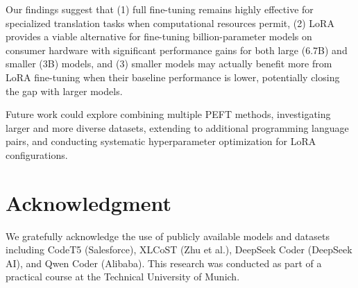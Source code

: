 \documentclass[conference]{IEEEtran}
\begin{document}
Our findings suggest that (1) full fine-tuning remains highly effective for specialized translation tasks when computational resources permit, (2) LoRA provides a viable alternative for fine-tuning billion-parameter models on consumer hardware with significant performance gains for both large (6.7B) and smaller (3B) models, and (3) smaller models may actually benefit more from LoRA fine-tuning when their baseline performance is lower, potentially closing the gap with larger models.

Future work could explore combining multiple PEFT methods, investigating larger and more diverse datasets, extending to additional programming language pairs, and conducting systematic hyperparameter optimization for LoRA configurations.

\section*{Acknowledgment}

We gratefully acknowledge the use of publicly available models and datasets including CodeT5 (Salesforce), XLCoST (Zhu et al.), DeepSeek Coder (DeepSeek AI), and Qwen Coder (Alibaba). This research was conducted as part of a practical course at the Technical University of Munich.
\end{document}
